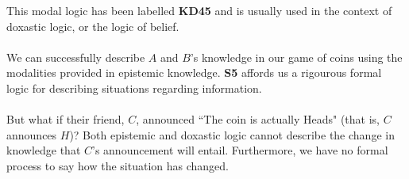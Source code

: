 \documentclass[10pt, a4paper, twoside]{article}
\begin{document}
This modal logic has been labelled {\bf KD45} and is usually used in the context
of doxastic logic, or the logic of belief.\\
\\
We can successfully describe $A$ and $B$'s knowledge in our game of coins using
the modalities provided in epistemic knowledge.
{\bf S5} affords us a rigourous formal logic for describing situations regarding
information.\\
\\
But what if their friend, $C$, announced ``The coin is actually Heads" (that is,
$C$ announces $H$)?
Both epistemic and doxastic logic cannot describe the change in knowledge that
$C$'s announcement will entail.
Furthermore, we have no formal process to say how the situation has changed.
%
\end{document}
